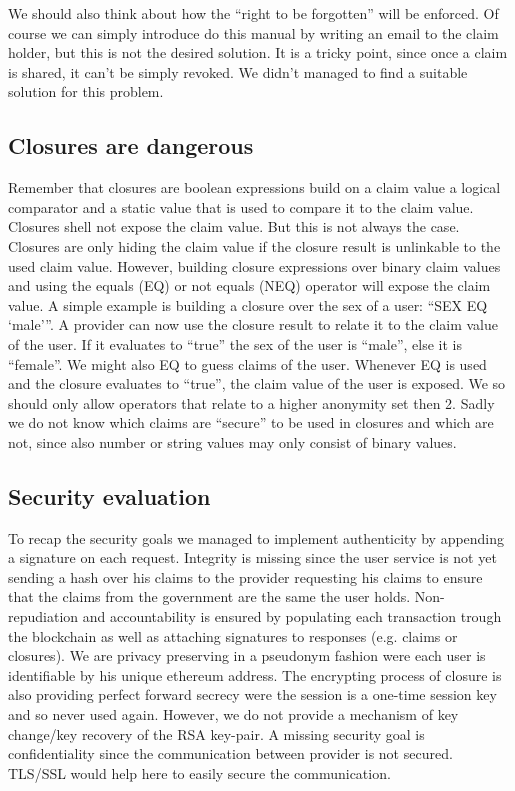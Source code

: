 We should also think about how the “right to be forgotten” will be enforced. Of course we can simply introduce do this manual by writing an email to the claim holder, but this is not the desired solution. It is a tricky point, since once a claim is shared, it can’t be simply revoked. We didn’t managed to find a suitable solution for this problem.  

\subsection{Closures are dangerous}
Remember that closures are boolean expressions build on a claim value a logical comparator and a static value that is used to compare it to the claim value. Closures shell not expose the claim value. But this is not always the case. Closures are only hiding the claim value if the closure result is unlinkable to the used claim value. However, building closure expressions over binary claim values and using the equals (EQ) or not equals (NEQ) operator will expose the claim value. A simple example is building a closure over the sex of a user: “SEX EQ ‘male’”. A provider can now use the closure result to relate it to the claim value of the user. If it evaluates to “true” the sex of the user is “male”, else it is “female”. We might also EQ to guess claims of the user. Whenever EQ is used and the closure evaluates to “true”, the claim value of the user is exposed. We so should only allow operators that relate to a higher anonymity set then 2. Sadly we do not know which claims are “secure” to be used in closures and which are not, since also number or string values may only consist of binary values. 

\subsection{Security evaluation}
\label{sec:securityEvaluation}
To recap the security goals we managed to implement authenticity by appending a signature on each request. Integrity is missing since the user service is not yet sending a hash over his claims to the provider requesting his claims to ensure that the claims from the government are the same the user holds. Non-repudiation and accountability is ensured by populating each transaction trough the blockchain as well as attaching signatures to responses (e.g. claims or closures). We are privacy preserving in a pseudonym fashion were each user is identifiable by his unique ethereum address. The encrypting process of closure is also providing perfect forward secrecy were the session is a one-time session key and so never used again. However, we do not provide a mechanism of key change/key recovery of the RSA key-pair. A missing security goal is confidentiality since the communication between provider is not secured. TLS/SSL would help here to easily secure the communication. 

